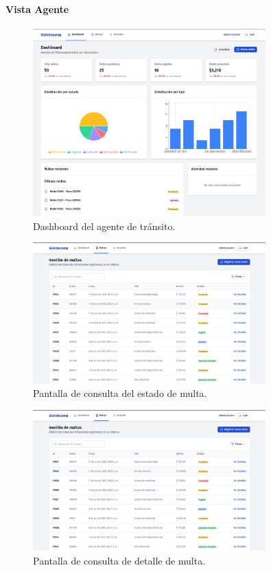 \documentclass[
    letterpaper, 
    man,   
    spanish,
    12pt,
    donotrepeattitle,
    floatsintext,
    hidelinks %
]{apa7}
\begin{document}
\paragraph{Vista Agente}
\begin{figure}[htbp]
    \centering
    \includegraphics[width=0.8\textwidth]{Images/UI3.png}
    \caption{Dashboard del agente de tránsito.}
    \label{fig:dashboard_agente}
\end{figure}
\begin{figure}[htbp]
    \centering
    \includegraphics[width=0.8\textwidth]{Images/UI4.png}
    \caption{Pantalla de consulta del estado de multa.}
    \label{fig:consulta_estado_multa}
\end{figure}
\begin{figure}[htbp]
    \centering
    \includegraphics[width=0.8\textwidth]{Images/UI4.png}
    \caption{Pantalla de consulta de detalle de multa.}
    \label{fig:consulta_detalle_multa}
\end{figure}
\end{document}

